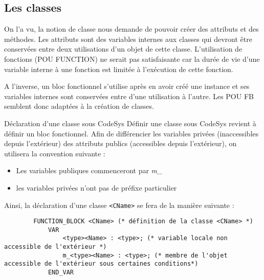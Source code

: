 \subsection{Les classes}

On l'a vu, la notion de classe nous demande de pouvoir créer des attributs et des méthodes. Les attributs sont des variables internes aux classes qui devront être conservées entre deux utilisations d'un objet de cette classe.
L'utilisation de fonctions (POU FUNCTION) ne serait pas satisfaisante car la durée de vie d'une variable interne à une fonction est limitée à l'exécution de cette fonction.

A l'inverse, un bloc fonctionnel s'utilise après en avoir créé une instance et ses variables internes sont conservées entre d'une utilisation à l'autre. Les POU FB semblent donc adaptées à la création de classes.


\begin{UPSTIinfor}{Déclaration d'une classe sous CodeSys}
    Définir une classe sous CodeSys revient à définir un bloc fonctionnel. Afin de différencier les variables privées (inaccessibles depuis l'extérieur) des attributs publics (accessibles depuis l'extérieur), on utilisera la convention suivante :
    \begin{itemize}
        \item Les variables publiques commenceront par \emph{m\_}
        \item les variables privées n'ont pas de préfixe particulier
    \end{itemize}

    Ainsi, la déclaration d'une classe \lstinline[language=ST]{<CName>} se fera de la manière suivante :
    \begin{lstlisting}
        FUNCTION_BLOCK <CName> (* définition de la classe <CName> *)
            VAR
                <type><Name> : <type>; (* variable locale non accessible de l'extérieur *)
                m_<type><Name> : <type>; (* membre de l'objet accessible de l'extérieur sous certaines conditions*)
            END_VAR
    \end{lstlisting}
\end{UPSTIinfor}

